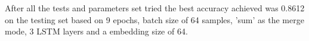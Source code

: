 \documentclass{article}
\begin{document}
After all the tests and parameters set tried the best accuracy achieved was 0.8612 on the testing set based on 9 epochs, batch size of 64 samples, 'sum' as the merge mode, 3 LSTM layers and a embedding size of 64.


\clearpage



\end{document}
